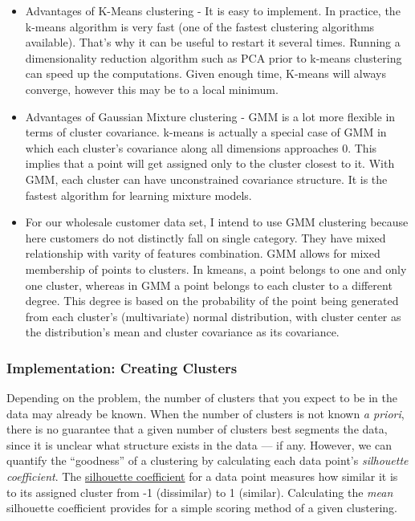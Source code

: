 \documentclass[11pt]{article}
\begin{document}
\begin{itemize}
\item
  Advantages of K-Means clustering - It is easy to implement. In
  practice, the k-means algorithm is very fast (one of the fastest
  clustering algorithms available). That's why it can be useful to
  restart it several times. Running a dimensionality reduction algorithm
  such as PCA prior to k-means clustering can speed up the computations.
  Given enough time, K-means will always converge, however this may be
  to a local minimum.
\item
  Advantages of Gaussian Mixture clustering - GMM is a lot more flexible
  in terms of cluster covariance. k-means is actually a special case of
  GMM in which each cluster's covariance along all dimensions approaches
  0. This implies that a point will get assigned only to the cluster
  closest to it. With GMM, each cluster can have unconstrained
  covariance structure. It is the fastest algorithm for learning mixture
  models.
\item
  For our wholesale customer data set, I intend to use GMM clustering
  because here customers do not distinctly fall on single category. They
  have mixed relationship with varity of features combination. GMM
  allows for mixed membership of points to clusters. In kmeans, a point
  belongs to one and only one cluster, whereas in GMM a point belongs to
  each cluster to a different degree. This degree is based on the
  probability of the point being generated from each cluster's
  (multivariate) normal distribution, with cluster center as the
  distribution's mean and cluster covariance as its covariance.
\end{itemize}

    \hypertarget{implementation-creating-clusters}{%
\subsubsection{Implementation: Creating
Clusters}\label{implementation-creating-clusters}}

Depending on the problem, the number of clusters that you expect to be
in the data may already be known. When the number of clusters is not
known \emph{a priori}, there is no guarantee that a given number of
clusters best segments the data, since it is unclear what structure
exists in the data --- if any. However, we can quantify the ``goodness''
of a clustering by calculating each data point's \emph{silhouette
coefficient}. The
\href{http://scikit-learn.org/stable/modules/generated/sklearn.metrics.silhouette_score.html}{silhouette
coefficient} for a data point measures how similar it is to its assigned
cluster from -1 (dissimilar) to 1 (similar). Calculating the \emph{mean}
silhouette coefficient provides for a simple scoring method of a given
clustering.
\end{document}
